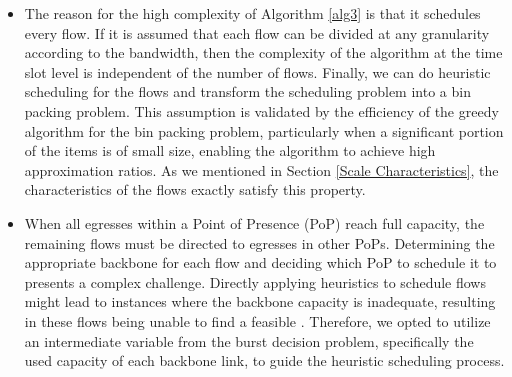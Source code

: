 \begin{itemize}
\item {} The reason for the high complexity of Algorithm \ref{alg3} is that it schedules every flow. If it is assumed that each flow can be divided at any granularity according to the bandwidth, then the complexity of the algorithm at the time slot level is independent of the number of flows. Finally, we can do heuristic scheduling for the flows and transform the scheduling problem into a bin packing problem. This assumption is validated by the efficiency of the greedy algorithm for the bin packing problem, particularly when a significant portion of the items is of small size, enabling the algorithm to achieve high approximation ratios. As we mentioned in Section \ref{Scale Characteristics}, the characteristics of the flows exactly satisfy this property.
\item {} When all egresses within a Point of Presence (PoP) reach full capacity, the remaining flows must be directed to egresses in other PoPs. Determining the appropriate backbone for each flow and deciding which PoP to schedule it to presents a complex challenge. Directly applying heuristics to schedule flows might lead to instances where the backbone capacity is inadequate, resulting in these flows being unable to find a feasible {\egress}. Therefore, we opted to utilize an intermediate variable from the burst decision problem, specifically the used capacity of each backbone link, to guide the heuristic scheduling process.
\end{itemize}


